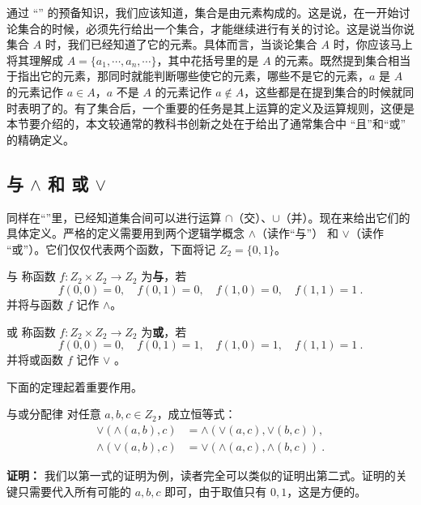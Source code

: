 
通过 “” 的预备知识，我们应该知道，集合是由元素构成的。这是说，在一开始讨论集合的时候，必须先行给出一个集合，才能继续进行有关的讨论。这是说当你说集合 $A$ 时，我们已经知道了它的元素。具体而言，当谈论集合 $A$ 时，你应该马上将其理解成 $A=\{a_1,\cdots,a_n,\cdots\}$，其中花括号里的是 $A$ 的元素。既然提到集合相当于指出它的元素，那同时就能判断哪些使它的元素，哪些不是它的元素，$a$ 是 $A$ 的元素记作 $a\in A$，$a$ 不是 $A$ 的元素记作 $a\notin A$，这些都是在提到集合的时候就同时表明了的。有了集合后，一个重要的任务是其上运算的定义及运算规则，这便是本节要介绍的，本文较通常的教科书创新之处在于给出了通常集合中 “且”和“或” 的精确定义。
\subsection{与 $\land$ 和 或 $\lor$}
同样在“”里，已经知道集合间可以进行运算 $\cap$（交）、$\cup$（并）。现在来给出它们的具体定义。严格的定义需要用到两个逻辑学概念 $\land$（读作“与”） 和 $\lor$（读作 “或”）。它们仅仅代表两个函数，下面将记 $Z_2=\{0,1\}$。
\begin{definition}{与}\label{def_OpSet_2}
称函数 $f:Z_2\times Z_2\rightarrow Z_2$ 为\textbf{与}，若
\begin{equation}
f(0,0)=0,\quad f(0,1)=0,\quad f(1,0)=0,\quad f(1,1)=1~.
\end{equation}
并将与函数 $f$ 记作 $\land$。
\end{definition}
\begin{definition}{或}\label{def_OpSet_1}
称函数 $f:Z_2\times Z_2\rightarrow Z_2$ 为\textbf{或}，若
\begin{equation}
f(0,0)=0,\quad f(0,1)=1,\quad f(1,0)=1,\quad f(1,1)=1~.
\end{equation}
并将或函数 $f$ 记作 $\lor$ 。
\end{definition}
下面的定理起着重要作用。
\begin{theorem}{与或分配律}\label{the_OpSet_1}
对任意 $a,b,c\in Z_2$，成立恒等式：
\begin{equation}\label{eq_OpSet_1}
\begin{aligned}
\lor(\land(a,b),c)&=\land(\lor(a,c),\lor(b,c)),\\
\land(\lor(a,b),c)&=\lor(\land(a,c),\land(b,c))~.
\end{aligned}
\end{equation}
\end{theorem}
\textbf{证明：}
我们以第一式的证明为例，读者完全可以类似的证明出第二式。证明的关键只需要代入所有可能的 $a,b,c$ 即可，由于取值只有 $0,1$，这是方便的。

